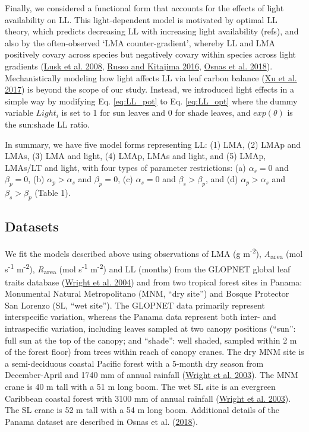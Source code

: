 \documentclass[
  12pt,
  a4paper,
,tablecaptionabove
]{scrartcl}
\begin{document}
Finally, we considered a functional form that accounts for the effects
of light availability on LL. This light-dependent model is motivated by
optimal LL theory, which predicts decreasing LL with increasing light
availability (refs), and also by the often-observed `LMA
counter-gradient', whereby LL and LMA positively covary across species
but negatively covary within species across light gradients
(\protect\hyperlink{ref-Lusk2008}{Lusk et al. 2008},
\protect\hyperlink{ref-Russo2016}{Russo and Kitajima 2016},
\protect\hyperlink{ref-Osnas2018}{Osnas et al. 2018}). Mechanistically
modeling how light affects LL via leaf carbon balance
(\protect\hyperlink{ref-Xu2017}{Xu et al. 2017}) is beyond the scope of
our study. Instead, we introduced light effects in a simple way by
modifying Eq. \ref{eq:LL_pot} to Eq. \ref{eq:LL_opt} where the dummy
variable \(Light_i\) is set to 1 for sun leaves and 0 for shade leaves,
and \(exp(\theta)\) is the sun:shade LL ratio.

In summary, we have five model forms representing LL: (1) LMA, (2) LMAp
and LMAs, (3) LMA and light, (4) LMAp, LMAs and light, and (5) LMAp,
LMAs/LT and light, with four types of parameter restrictions: (a)
\(\alpha_s = 0\) and \(\beta_p = 0\), (b) \(\alpha_p > \alpha_s\) and
\(\beta_p = 0\), (c) \(\alpha_s = 0\) and \(\beta_s > \beta_p\), and (d)
\(\alpha_p > \alpha_s\) and \(\beta_s > \beta_p\) (Table 1).

\hypertarget{datasets}{%
\subsection{Datasets}\label{datasets}}

We fit the models described above using observations of LMA (g
m\textsuperscript{-2}), \emph{A}\textsubscript{area} (mol
s\textsuperscript{-1} m\textsuperscript{-2}),
\emph{R}\textsubscript{area} (mol s\textsuperscript{-1}
m\textsuperscript{-2}) and LL (months) from the GLOPNET global leaf
traits database (\protect\hyperlink{ref-Wright2004a}{Wright et al.
2004}) and from two tropical forest sites in Panama: Monumental Natural
Metropolitano (MNM, ``dry site'') and Bosque Protector San Lorenzo (SL,
``wet site''). The GLOPNET data primarily represent interspecific
variation, whereas the Panama data represent both inter- and
intraspecific variation, including leaves sampled at two canopy
positions (``sun'': full sun at the top of the canopy; and ``shade'':
well shaded, sampled within 2 m of the forest floor) from trees within
reach of canopy cranes. The dry MNM site is a semi-deciduous coastal
Pacific forest with a 5-month dry season from December-April and 1740 mm
of annual rainfall (\protect\hyperlink{ref-Wright2003}{Wright et al.
2003}). The MNM crane is 40 m tall with a 51 m long boom. The wet SL
site is an evergreen Caribbean coastal forest with 3100 mm of annual
rainfall (\protect\hyperlink{ref-Wright2003}{Wright et al. 2003}). The
SL crane is 52 m tall with a 54 m long boom. Additional details of the
Panama dataset are described in Osnas et al.
(\protect\hyperlink{ref-Osnas2018}{2018}).
\end{document}
